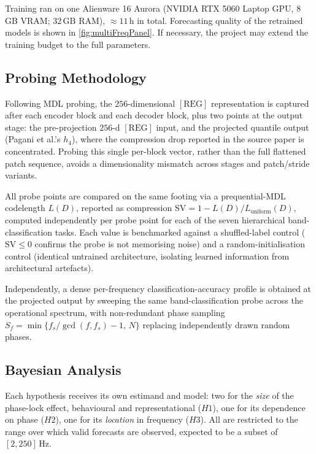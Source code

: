 Training ran on one Alienware 16 Aurora (NVIDIA RTX 5060 Laptop GPU, 8\,GB VRAM; 32\,GB RAM), ${\approx}11\,\mathrm{h}$ in total. Forecasting quality of the retrained models is shown in \autoref{fig:multiFreqPanel}. If necessary, the project may extend the training budget to the full parameters.

\subsection{Probing Methodology}
\label{subsec:probing}
Following MDL probing\cite{voitaInformationTheoreticProbingMinimum2020}, the $256$-dimensional $[\mathrm{REG}]$ representation is captured after each encoder block and each decoder block, plus two points at the output stage: the pre-projection $256$-d $[\mathrm{REG}]$ input, and the projected quantile output (Pagani et al.'s $h_4$\cite{paganiPreliminaryInsightsChronos2026}), where the compression drop reported in the source paper is concentrated. Probing this single per-block vector, rather than the full flattened patch sequence, avoids a dimensionality mismatch across stages and patch/stride variants.

All probe points are compared on the same footing via a prequential-MDL codelength $L(D)$, reported as compression $\mathrm{SV}=1-L(D)/L_{\mathrm{uniform}}(D)$, computed independently per probe point for each of the seven hierarchical band-classification tasks\cite{paganiPreliminaryInsightsChronos2026}. Each value is benchmarked against a shuffled-label control ($\mathrm{SV}\le 0$ confirms the probe is not memorising noise) and a random-initialisation control (identical untrained architecture, isolating learned information from architectural artefacts).

Independently, a dense per-frequency classification-accuracy profile is obtained at the projected output by sweeping the same band-classification probe across the operational spectrum, with non-redundant phase sampling $S_f=\min\{f_s/\gcd(f,f_s)-1,\,N\}$ replacing independently drawn random phases.

\subsection{Bayesian Analysis}
Each hypothesis receives its own estimand and model: two for the \emph{size} of the phase-lock effect, behavioural and representational ($H1$), one for its dependence on phase ($H2$), one for its \emph{location} in frequency ($H3$). All are restricted to the range over which valid forecasts are observed, expected to be a subset of $[2,250]\,\mathrm{Hz}$.

